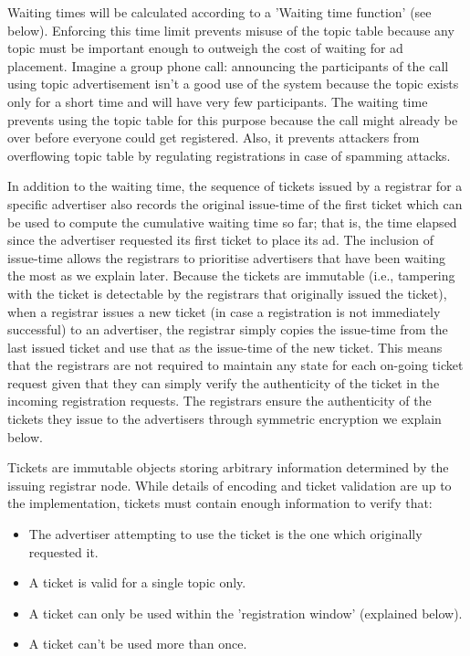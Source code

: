 Waiting times will be calculated according to a 'Waiting time function' (see below). Enforcing this time limit prevents misuse of the topic table because any topic must be important enough to outweigh the cost of waiting for ad placement. Imagine a group phone call: announcing the participants of the call using topic advertisement isn't a good use of the system because the topic exists only for a short time and will have very few participants. The waiting time prevents using the topic table for this purpose because the call might already be over before everyone could get registered. Also, it prevents attackers from overflowing topic table by regulating registrations in case of spamming attacks.

In addition to the waiting time, the sequence of tickets issued by a registrar for a specific advertiser also records the original issue-time of the first ticket which can be used to compute the cumulative waiting time so far; that is, the time elapsed since the advertiser requested its first ticket to place its ad. The inclusion of issue-time allows the registrars to prioritise advertisers that have been waiting the most as we explain later. Because the tickets are immutable (i.e., tampering with the ticket is detectable by the registrars that originally issued the ticket), when a registrar issues a new ticket (in case a registration is not immediately successful) to an advertiser, the registrar simply copies the issue-time from the last issued ticket and use that as the issue-time of the new ticket. This means that the registrars are not required to maintain any state for each on-going ticket request given that they can simply verify the authenticity of the ticket in the incoming registration requests. The registrars ensure the authenticity of the tickets they issue to the advertisers through symmetric encryption we explain below.

Tickets are immutable objects storing arbitrary information determined by the issuing registrar node. While details of encoding and ticket validation are up to the implementation, tickets must contain enough information to verify that:
\begin{itemize}
    \item The advertiser attempting to use the ticket is the one which originally requested it.
    \item A ticket is valid for a single topic only.
    \item A ticket can only be used within the 'registration window' (explained below).
    \item A ticket can't be used more than once.
\end{itemize}

